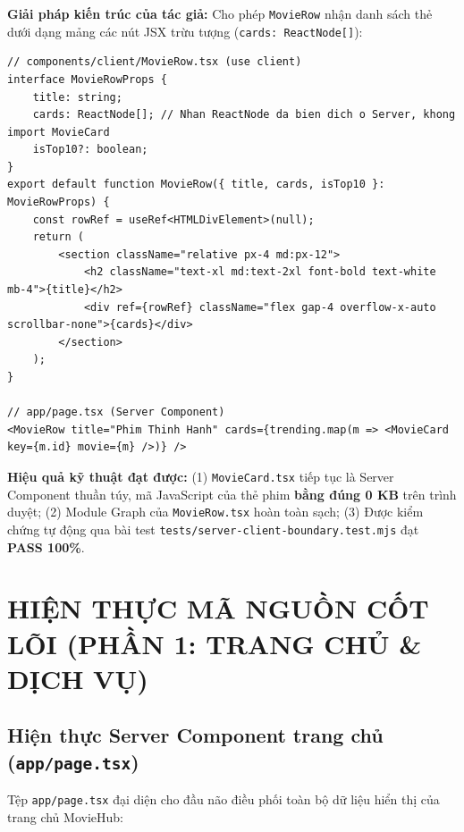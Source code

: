 \documentclass[12pt,a4paper]{extarticle}
\begin{document}
\noindent \textbf{Giải pháp kiến trúc của tác giả:} Cho phép \texttt{MovieRow} nhận danh sách thẻ dưới dạng mảng các nút JSX trừu tượng (\texttt{cards: ReactNode[]}):

\begin{lstlisting}[caption={Composition Pattern truyền Server Components qua props cards}]
// components/client/MovieRow.tsx (use client)
interface MovieRowProps {
    title: string;
    cards: ReactNode[]; // Nhan ReactNode da bien dich o Server, khong import MovieCard
    isTop10?: boolean;
}
export default function MovieRow({ title, cards, isTop10 }: MovieRowProps) {
    const rowRef = useRef<HTMLDivElement>(null);
    return (
        <section className="relative px-4 md:px-12">
            <h2 className="text-xl md:text-2xl font-bold text-white mb-4">{title}</h2>
            <div ref={rowRef} className="flex gap-4 overflow-x-auto scrollbar-none">{cards}</div>
        </section>
    );
}

// app/page.tsx (Server Component)
<MovieRow title="Phim Thinh Hanh" cards={trending.map(m => <MovieCard key={m.id} movie={m} />)} />
\end{lstlisting}

\noindent \textbf{Hiệu quả kỹ thuật đạt được:} (1) \texttt{MovieCard.tsx} tiếp tục là Server Component thuần túy, mã JavaScript của thẻ phim \textbf{bằng đúng 0 KB} trên trình duyệt; (2) Module Graph của \texttt{MovieRow.tsx} hoàn toàn sạch; (3) Được kiểm chứng tự động qua bài test \nolinkurl{tests/server-client-boundary.test.mjs} đạt \textbf{PASS 100\%}.

\section{HIỆN THỰC MÃ NGUỒN CỐT LÕI (PHẦN 1: TRANG CHỦ \& DỊCH VỤ)}

\subsection{Hiện thực Server Component trang chủ (\texttt{app/page.tsx})}
Tệp \texttt{app/page.tsx} đại diện cho đầu não điều phối toàn bộ dữ liệu hiển thị của trang chủ MovieHub:
\end{document}
